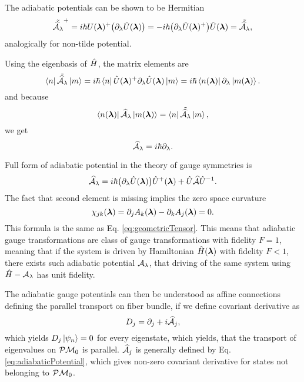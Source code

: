The adiabatic potentials can be shown to be Hermitian
\begin{equation}
     \tilde{\AA_\lambda}^+=i\hbar U(\llambda)^+\big(\partial_\lambda\U(\llambda)\big)=-i\hbar\big(\partial_\lambda\U(\llambda)^+\big)\U(\llambda) = \tilde{\AA_\lambda},
     \label{eq:counterdiabaticPotentialTwoSystems}
\end{equation}
analogically for non-tilde potential.

Using the eigenbasis of $\HH$, the matrix elements are
\begin{equation}
    \bra{n}\tilde{\AA_\lambda}\ket{m}=i\hbar\bra{n}\U(\llambda)^+\partial_\lambda\U(\llambda)\ket{m} = i\hbar\bra{n(\llambda)}\partial_\lambda\ket{m(\llambda)}.
\end{equation}
and because
\begin{equation}
    \bra{n(\llambda)}\AA_\lambda\ket{ m(\llambda)}= \bra{n}\tilde{\AA_\lambda}\ket{m},
\end{equation}
we get
\begin{equation}
    \AA_\lambda = i\hbar\partial_\lambda.
    \label{eq:adiabaticPotentialDefinition}
\end{equation}



Full form of adiabatic potential in the theory of gauge symmetries is
\begin{equation}
    \AA_\lambda=i\hbar \big(\partial_\lambda \U(\llambda)\big)\U^+(\llambda) + \U \AA \U^{-1}.
\end{equation}
The fact that second element is missing implies the zero space curvature
\begin{equation}
    \chi_{jk}(\llambda) = \partial_j A_k(\llambda)-\partial_k A_j(\llambda) = 0.
\end{equation}
This formula is the same as Eq. \ref{eq:geometricTensor}. This means that adiabatic gauge transformations are class of gauge transformations with fidelity $F=1$, meaning that if the system is driven by Hamiltonian $\HH(\llambda)$ with fidelity $F<1$, there exists such adiabatic potential $\A_\lambda$, that driving of the same system using $\HH-\A_\lambda$ has unit fidelity.

The adiabatic gauge potentials can then be understood as affine connections defining the parallel transport on fiber bundle, if we define covariant derivative as
\begin{equation}
    D_j=\partial_j+i\AA_j,
\end{equation}
which yields $D_j\ket{\psi_n}=0$ for every eigenstate, which yields, that the transport of eigenvalues on $\P\M_0$ is parallel. $\AA_j$ is generally defined by Eq. \ref{eq:adiabaticPotential}, which gives non-zero covariant derivative for states not belonging to $\P\M_0$. 

